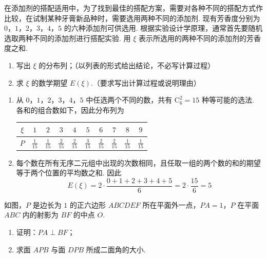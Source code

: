 \begin{problem}
在添加剂的搭配适用中，为了找到最佳的搭配方案，需要对各种不同的搭配方式作比较，在试制某种牙膏新品种时，需要选用两种不同的添加剂. 现有芳香度分别为 \(0\)，\(1\)，\(2\)，\(3\)，\(4\)，\(5\) 的六种添加剂可供选用. 根据实验设计学原理，通常首先要随机选取两种不同的添加剂进行搭配实验. 用 \(\xi\) 表示所选用的两种不同的添加剂的芳香度之和.

\begin{enumerate}
\item 写出 \(\xi\) 的分布列；（以列表的形式给出结论，不必写计算过程）
\item 求 \(\xi\) 的数学期望 \(E(\xi)\).（要求写出计算过程或说明理由）
\end{enumerate}
\end{problem}

\begin{solution}
\begin{enumerate}
\item 从 \(0\)，\(1\)，\(2\)，\(3\)，\(4\)，\(5\) 中任选两个不同的数，共有 \(\mathrm C_{6}^{2}=15\) 种等可能的选法. 各和的组合数如下，因此分布列为
\begin{center}
\begin{tabular}{c|ccccccccc}
\(\xi\) & \(1\) & \(2\) & \(3\) & \(4\) & \(5\) & \(6\) & \(7\) & \(8\) & \(9\) \\
\hline
\(P\) & \(\frac{1}{15}\) & \(\frac{1}{15}\) & \(\frac{2}{15}\) & \(\frac{2}{15}\) & \(\frac{3}{15}\) & \(\frac{2}{15}\) & \(\frac{2}{15}\) & \(\frac{1}{15}\) & \(\frac{1}{15}\)
\end{tabular}
\end{center}
\item 每个数在所有无序二元组中出现的次数相同，且任取一组的两个数的和的期望等于两个位置的平均数之和. 因此
\[
E(\xi)=2\cdot\frac{0+1+2+3+4+5}{6}=2\cdot\frac{15}{6}=5
\]
\end{enumerate}
\end{solution}

\begin{problem}
如图，\(P\) 是边长为 \(1\) 的正六边形 \(ABCDEF\) 所在平面外一点，\(PA = 1\)，\(P\) 在平面 \(ABC\) 内的射影为 \(BF\) 的中点 \(O\).

\begin{enumerate}
\item 证明：\(PA \perp BF\)；
\item 求面 \(APB\) 与面 \(DPB\) 所成二面角的大小.
\end{enumerate}

\end{problem}

